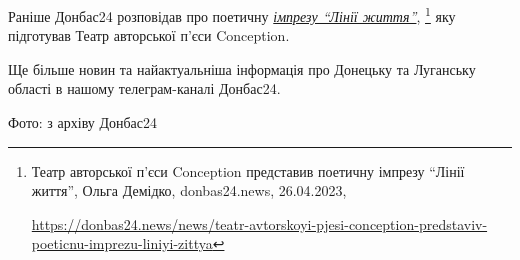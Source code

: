 
Раніше Донбас24 розповідав про поетичну \href{https://donbas24.news/news/teatr-avtorskoyi-pjesi-conception-predstaviv-poeticnu-imprezu-liniyi-zittya}{\emph{імпрезу \enquote{Лінії життя}}},%
\footnote{Театр авторської п'єси Conception представив поетичну імпрезу \enquote{Лінії життя}, Ольга Демідко, donbas24.news, 26.04.2023, \par\url{https://donbas24.news/news/teatr-avtorskoyi-pjesi-conception-predstaviv-poeticnu-imprezu-liniyi-zittya}}
яку підготував Театр авторської п'єси Conception.

Ще більше новин та найактуальніша інформація про Донецьку та Луганську області
в нашому телеграм-каналі Донбас24.

Фото: з архіву Донбас24

